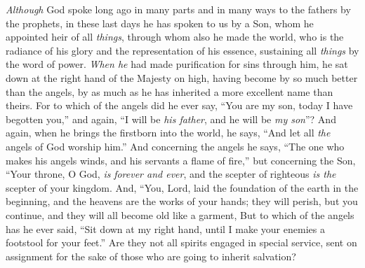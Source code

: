 
\begin{biblechapter} %
 \textit{Although} God spoke long ago in many parts and in many ways to the fathers by the prophets,
\verse in these last days he has spoken to us by a Son, whom he appointed heir of all \textit{things}, through whom also he made the world,
\verse who is the radiance of his glory and the representation of his essence, sustaining all \textit{things} by the word of power. \textit{When he} had made purification for sins through him, he sat down at the right hand of the Majesty on high,
\verse having become by so much better than the angels, by as much as he has inherited a more excellent name than theirs.
 For to which of the angels did he ever say, “You are my son, 
today I have begotten you,” and again, “I will be \textit{his father}, 
and he will be \textit{my son}”?
\verse And again, when he brings the firstborn into the world, he says, “And let all \textit{the} angels of God worship him.”
\verse And concerning the angels he says, “The one who makes his angels winds, 
and his servants a flame of fire,”
\verse but concerning the Son,
\verse “Your throne, O God, \textit{is} \textit{forever and ever}, 
and the scepter of righteous \textit{is the} scepter of your kingdom.
\verse And,
\verse “You, Lord, laid the foundation of the earth in the beginning, 
and the heavens are the works of your hands;
\verse they will perish, but you continue, 
and they will all become old like a garment,
\verse But to which of the angels has he ever said, “Sit down at my right hand, 
until I make your enemies a footstool for your feet.”
\verse Are they not all spirits engaged in special service, sent on assignment for the sake of those who are going to inherit salvation?
\end{biblechapter}

